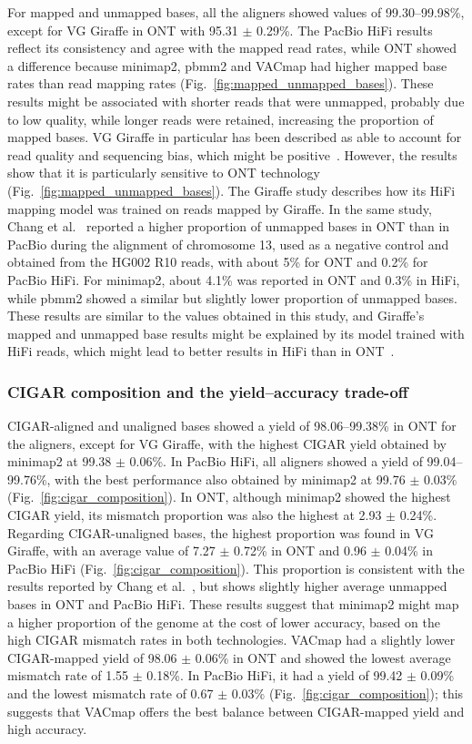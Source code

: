 \documentclass[12pt, letterpaper]{article}
\begin{document}
For mapped and unmapped bases, all the aligners showed values of 99.30--99.98\%, except for VG Giraffe in ONT with 95.31 $\pm$ 0.29\%. The PacBio HiFi results reflect its consistency and agree with the mapped read rates, while ONT showed a difference because minimap2, pbmm2 and VACmap had higher mapped base rates than read mapping rates (Fig.~\ref{fig:mapped_unmapped_bases}). These results might be associated with shorter reads that were unmapped, probably due to low quality, while longer reads were retained, increasing the proportion of mapped bases. VG Giraffe in particular has been described as able to account for read quality and sequencing bias, which might be positive~\cite{Liu2024}. However, the results show that it is particularly sensitive to ONT technology (Fig.~\ref{fig:mapped_unmapped_bases}). The Giraffe study describes how its HiFi mapping model was trained on reads mapped by Giraffe. In the same study, Chang et al.~\cite{Chang2025} reported a higher proportion of unmapped bases in ONT than in PacBio during the alignment of chromosome 13, used as a negative control and obtained from the HG002 R10 reads, with about 5\% for ONT and 0.2\% for PacBio HiFi. For minimap2, about 4.1\% was reported in ONT and 0.3\% in HiFi, while pbmm2 showed a similar but slightly lower proportion of unmapped bases. These results are similar to the values obtained in this study, and Giraffe's mapped and unmapped base results might be explained by its model trained with HiFi reads, which might lead to better results in HiFi than in ONT~\cite{Chang2025}.

\subsubsection{CIGAR composition and the yield--accuracy trade-off}
CIGAR-aligned and unaligned bases showed a yield of 98.06--99.38\% in ONT for the aligners, except for VG Giraffe, with the highest CIGAR yield obtained by minimap2 at 99.38 $\pm$ 0.06\%. In PacBio HiFi, all aligners showed a yield of 99.04--99.76\%, with the best performance also obtained by minimap2 at 99.76 $\pm$ 0.03\% (Fig.~\ref{fig:cigar_composition}). In ONT, although minimap2 showed the highest CIGAR yield, its mismatch proportion was also the highest at 2.93 $\pm$ 0.24\%. Regarding CIGAR-unaligned bases, the highest proportion was found in VG Giraffe, with an average value of 7.27 $\pm$ 0.72\% in ONT and 0.96 $\pm$ 0.04\% in PacBio HiFi (Fig.~\ref{fig:cigar_composition}). This proportion is consistent with the results reported by Chang et al.~\cite{Chang2025}, but shows slightly higher average unmapped bases in ONT and PacBio HiFi. These results suggest that minimap2 might map a higher proportion of the genome at the cost of lower accuracy, based on the high CIGAR mismatch rates in both technologies. VACmap had a slightly lower CIGAR-mapped yield of 98.06 $\pm$ 0.06\% in ONT and showed the lowest average mismatch rate of 1.55 $\pm$ 0.18\%. In PacBio HiFi, it had a yield of 99.42 $\pm$ 0.09\% and the lowest mismatch rate of 0.67 $\pm$ 0.03\% (Fig.~\ref{fig:cigar_composition}); this suggests that VACmap offers the best balance between CIGAR-mapped yield and high accuracy.
\end{document}
